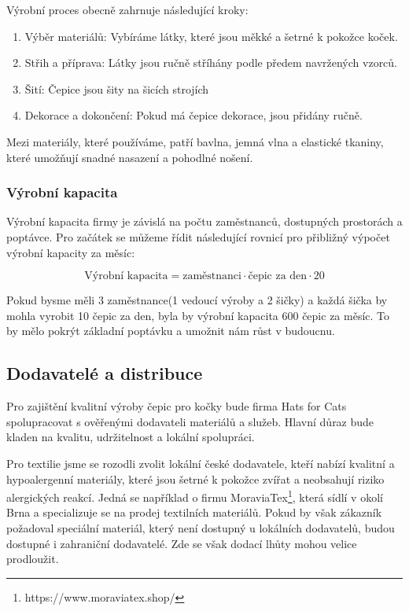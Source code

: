 \documentclass[12pt, a4paper]{article}
\begin{document}
Výrobní proces obecně zahrnuje následující kroky:

\begin{enumerate}
  \item Výběr materiálů: Vybíráme látky, které jsou měkké a šetrné k pokožce koček.
  \item Střih a příprava: Látky jsou ručně stříhány podle předem navržených vzorců.
  \item Šití: Čepice jsou šity na šicích strojích
  \item Dekorace a dokončení: Pokud má čepice dekorace, jsou přidány ručně.
\end{enumerate}

Mezi materiály, které používáme, patří bavlna, jemná vlna a elastické tkaniny, které umožňují snadné nasazení a pohodlné nošení.

\subsubsection{Výrobní kapacita}

Výrobní kapacita firmy je závislá na počtu zaměstnanců, dostupných prostorách a poptávce.
Pro začátek se můžeme řídit následující rovnicí pro přibližný výpočet výrobní kapacity za měsíc:

\begin{equation}
  \text{Výrobní kapacita} = \text{zaměstnanci} \cdot \text{čepic za den} \cdot 20
\end{equation}

Pokud bysme měli 3 zaměstnance(1 vedoucí výroby a 2 šičky) a každá šička by mohla vyrobit 10 čepic za den, byla by výrobní kapacita 600 čepic za měsíc.
To by mělo pokrýt základní poptávku a umožnit nám růst v budoucnu.

\subsection{Dodavatelé a distribuce}

Pro zajištění kvalitní výroby čepic pro kočky bude firma Hats for Cats spolupracovat s ověřenými dodavateli materiálů a služeb.
Hlavní důraz bude kladen na kvalitu, udržitelnost a lokální spolupráci.

Pro textilie jsme se rozodli zvolit lokální české dodavatele, kteří nabízí
kvalitní a hypoalergenní materiály, které jsou šetrné k pokožce zvířat a
neobsahují riziko alergických reakcí. Jedná se například o firmu MoraviaTex\footnote{https://www.moraviatex.shop/},
která sídlí v okolí Brna a specializuje se na prodej textilních materiálů. Pokud
by však zákazník požadoval speciální materiál, který není dostupný u lokálních dodavatelů,
budou dostupné i zahraniční dodavatelé. Zde se však dodací lhůty mohou velice prodloužit.
\end{document}
